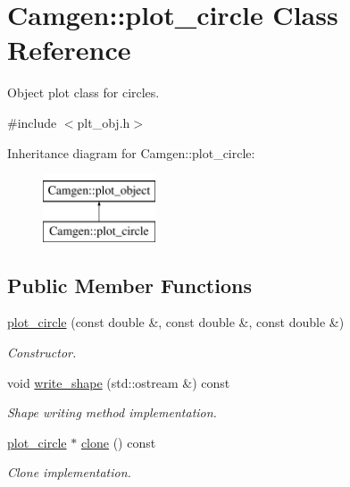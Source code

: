\hypertarget{a00426}{}\section{Camgen\+:\+:plot\+\_\+circle Class Reference}
\label{a00426}


Object plot class for circles.  




{\ttfamily \#include $<$plt\+\_\+obj.\+h$>$}

Inheritance diagram for Camgen\+:\+:plot\+\_\+circle\+:\begin{figure}[H]
\begin{center}
\leavevmode
\includegraphics[height=2.000000cm]{a00426}
\end{center}
\end{figure}
\subsection*{Public Member Functions}
\begin{DoxyCompactItemize}
\item 
\hypertarget{a00426_a5f91cab0cc15084ddf6d64d2b42357d0}{}\hyperlink{a00426_a5f91cab0cc15084ddf6d64d2b42357d0}{plot\+\_\+circle} (const double \&, const double \&, const double \&)\label{a00426_a5f91cab0cc15084ddf6d64d2b42357d0}

\begin{DoxyCompactList}\small\item\em Constructor. \end{DoxyCompactList}\item 
\hypertarget{a00426_add83473ec3905a07e09921c2e9f9633a}{}void \hyperlink{a00426_add83473ec3905a07e09921c2e9f9633a}{write\+\_\+shape} (std\+::ostream \&) const \label{a00426_add83473ec3905a07e09921c2e9f9633a}

\begin{DoxyCompactList}\small\item\em Shape writing method implementation. \end{DoxyCompactList}\item 
\hypertarget{a00426_adf58747fbdef62d6c40ea914ba9c792c}{}\hyperlink{a00426}{plot\+\_\+circle} $\ast$ \hyperlink{a00426_adf58747fbdef62d6c40ea914ba9c792c}{clone} () const \label{a00426_adf58747fbdef62d6c40ea914ba9c792c}

\begin{DoxyCompactList}\small\item\em Clone implementation. \end{DoxyCompactList}\end{DoxyCompactItemize}
